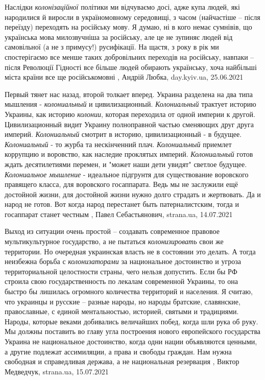 Наслідки \emph{колонізаційної} політики ми відчуваємо досі, адже купа людей, які
народилися й виросли в україномовному середовищі, з часом (найчастіше – після
переїзду) переходять на російську мову. Я думаю, ні в кого немає сумнівів, що
українська мова милозвучніша за російську, але це не зупиняє людей від
самовільної (а не з примусу!) русифікації. На щастя, з року в рік ми
спостерігаємо все менше таких добровільних переходів на російську, навпаки –
після Революції Гідності все більше людей обирають українську, хоча найбільші
міста країни все ще російськомовні
, Андрій Любка, day.kyiv.ua, 25.06.2021

Первый тянет нас назад, второй толкает вперед.  Украина разделена на два типа
мышления - \emph{колониальный} и цивилизационный.  \emph{Колониальный} трактует историю
Украины, как историю \emph{колонии}, которая переходила от одной империи к другой.
Цивилизационный видит Украину полноправной частью сменяющих друг друга империй.
\emph{Колониальный} смотрит в историю, цивилизационный - в будущее.  \emph{Колониальный} - то
журба та нескінченний плач. \emph{Колониальный} приемлет коррупцию и воровство, как
наследие проклятых империй. \emph{Колониальный} готов ждать десятилетиями перемен, и
"может наши дети увидят" светлое будущее. \emph{Колониальное мышление} - идеальное
підгрунтя для существование воровского правящего класса, для воровского
госаппарата. Ведь мы не заслужили ещё достойной жизни, для достойной жизни
нужно долго страдать и жертвовать. Да и народ не готов. Вот когда народ
перестанет быть патерналистским, тогда и госаппарат станет честным
, 
Павел Себастьянович, strana.ua, 14.07.2021

Выход из ситуации очень простой – создавать современное правовое
мультикультурное государство, а не пытаться \emph{колонизировать} свои же территории.
Но очередная украинская власть не в состоянии это делать. А тогда неизбежна
борьба с \emph{колонизаторами} за национальное достоинство и угроза территориальной
целостности страны, чего нельзя допустить.  Если бы РФ строила свою
государственность по лекалам современной Украины, то она быстро бы лишилась
огромного количества территорий и населения. Я считаю, что украинцы и русские –
разные народы, но народы братские, славянские, православные, с единой
ментальностью, историей, святыми и традициями. Народы, которые веками
добивались величайших побед, когда шли рука об руку.
Мы должны поставить во главу угла построения нового европейского государства
Украина не национальное достоинство, когда одни нации объявляются ценными, а
другие подлежат ассимиляции, а права и свободы граждан. Нам нужна свободная и
справедливая держава, а не национальная резервация
, 
Виктор Медведчук, strana.ua, 15.07.2021

